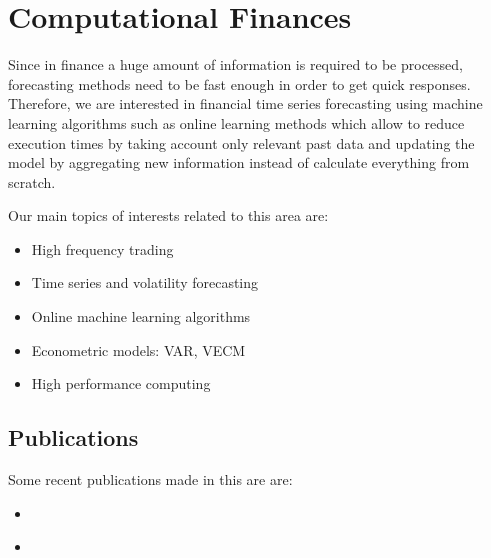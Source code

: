 \section{Computational Finances}

Since in finance a huge amount of information is required to be processed,
forecasting methods need to be fast enough in order to get quick responses.
Therefore, we are interested in financial time series forecasting using machine
learning algorithms such as online learning methods which allow to reduce
execution times by taking account only relevant past data and updating the model
by aggregating new information instead of calculate everything from scratch. 

Our main topics of interests related to this area are:

\begin{itemize}
\item High frequency trading
\item Time series and volatility forecasting
\item Online machine learning algorithms
\item Econometric models: VAR, VECM
\item High performance computing
\end{itemize}


\subsection{Publications}
Some recent publications made in this are are:
\begin{itemize}
\item \cite{arce+salinas2012}
\item \cite{arceetAl2012}
\end{itemize}
